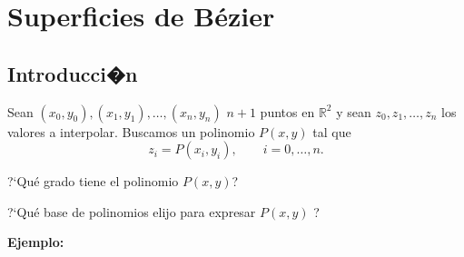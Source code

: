 \documentclass[twoside]{report}
\newcommand{\colocapdf}[2]{\quad\pdfimage width #2 {#1.pdf}}
\begin{document}
%
%
%
%
%
%
%
%
%

\section{Superficies de B\'{e}zier}

\subsection{Introducci�n}

Sean $(x_0,y_0),(x_1,y_1), \ldots,(x_n,y_n)$  \quad $n+1$ puntos en $\mathbb{R}^2$ y sean $z_0,z_1,\ldots,z_n$ los valores a interpolar. Buscamos un polinomio $P(x,y)$ tal que
$$z_i=P(x_i,y_i), \quad \quad i=0,\ldots,n.$$

?`Qu\'{e} grado tiene el polinomio $P(x,y)$?

?`Qu\'{e} base de polinomios elijo para expresar $P(x,y)$ ?

{\bf Ejemplo:}
\end{document}
